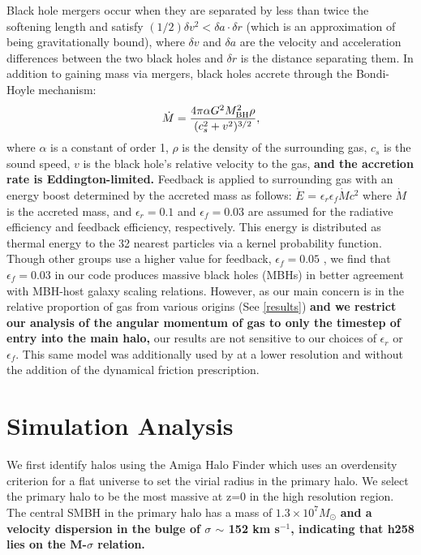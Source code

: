 \documentclass[]{emulateapj}
\begin{document}
Black hole mergers occur when they are separated by less than twice the softening length and satisfy $(1/2) \delta v^2 < \delta a \cdot \delta r$ (which is an approximation of being gravitationally bound),  where $\delta v$ and $\delta a$ are the velocity and acceleration differences between the two black holes and $\delta r$ is the distance separating them. In addition to gaining mass via mergers, black holes accrete through the Bondi-Hoyle mechanism:
\begin{equation}
\dot{M} = \frac{4 \pi \alpha G^2 M^{2}_{\rm BH} \rho}{(c^{2}_{s} + v^2)^{3/2}},
\end{equation}
where $\alpha$ is a constant of order 1, $\rho$ is the density of the surrounding gas, $c_s$ is the sound speed, $v$ is the black hole's relative velocity to the gas, \textbf{and the accretion rate is Eddington-limited.} Feedback is applied to surrounding gas with an energy boost determined by the accreted mass as follows: $\dot{E}$ = $\epsilon _{r}$$\epsilon_{f}$$\dot{M}$$c^2$ where $\dot{M}$ is the accreted mass, and $\epsilon _r = 0.1$ and $\epsilon _f = 0.03$ are assumed for the radiative efficiency and feedback efficiency, respectively. This energy is distributed as thermal energy to the 32 nearest particles via a kernel probability function. Though other groups use a higher value for feedback, $\epsilon _f = 0.05$ \citep{Sijacki2007,DiMatteo2008}, we find that $\epsilon_f = 0.03$ in our code produces massive black holes (MBHs) in better agreement with MBH-host galaxy scaling relations. However, as our main concern is in the relative proportion of gas from various origins (See \ref{results}) \textbf{and we restrict our analysis of the angular momentum of gas to only the timestep of entry into the main halo,} our results are not sensitive to our choices of $\epsilon _{r}$ or $\epsilon_{f}$. This same model was additionally used by \cite{Bellovary2013} at a lower resolution and without the addition of the dynamical friction prescription. 




\section{Simulation Analysis}\label{redux}

We first identify halos using the Amiga Halo Finder which uses an overdensity criterion for a flat universe \citep{Knebe2001,Knollmann2009,Gill2004} to set the virial radius in the primary halo. We select the primary halo to be the most massive at z=0 in the high resolution region. The central SMBH in the primary halo has a mass of $1.3 \times 10^{7} M_{\odot}$ \textbf{and a velocity dispersion in the bulge of $\sigma$ $\sim$ 152 km s$^{-1}$, indicating that h258 lies on the M-$\sigma$ relation.}
\end{document}
